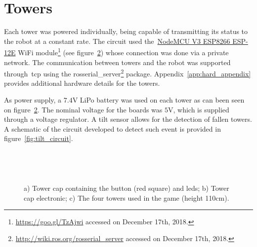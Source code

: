 \section{Towers}\label{sec:towers}
Each tower was powered individually, being capable of transmitting its status to the robot at a constant rate. The circuit used the~\href{https://einstronic.com/wp-content/uploads/2017/06/NodeMCU-ESP8266-ESP-12E-Catalogue.pdf}{NodeMCU V3 ESP8266 ESP-12E} WiFi module\footnote{\url{https://goo.gl/TzAjwi} accessed on December 17th, 2018.} (see figure~\ref{fig:tower_electronics}) whose connection was done via a private network. The communication between towers and the robot was supported through~\gls{tcp} using the rosserial\_server\footnote{\url{http://wiki.ros.org/rosserial_server} accessed on December 17th, 2018.} package. Appendix~\ref{app:hard_appendix} provides additional hardware details for the towers. 

As power supply, a $7.4$V LiPo battery was used on each tower as can been seen on figure~\ref{fig:tower_electronics}. The nominal voltage for the boards was $5$V, which is supplied through a voltage regulator. A tilt sensor allows for the detection of fallen towers. A schematic of the circuit developed to detect such event is provided in figure~\ref{fig:tilt_circuit}.

\begin{figure}[h]
  \centering
  \begin{subfigure}[b]{0.3\textwidth}
  	\centering
	\caption{}
	\label{fig:tower_cap_top}
  \end{subfigure}
  ~ 
  \begin{subfigure}[b]{0.3\textwidth}
  	\centering
	\caption{}
	\label{fig:tower_electronics}
  \end{subfigure}
  ~
   \begin{subfigure}[b]{0.3\textwidth}
	  \centering
      \caption{}
    \end{subfigure}
  \caption{a) Tower cap containing the button (red square) and \gls{led}s; b) Tower cap electronic; c) The four towers used in the game (height 110cm).}
  \label{fig:towers}
\end{figure}

